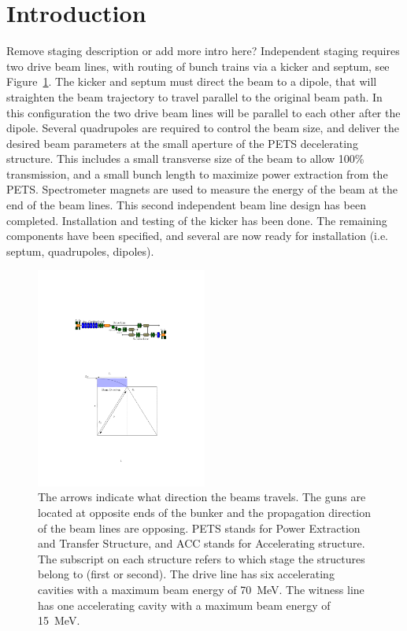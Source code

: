 \documentclass[aps,prab,preprint,groupedaddress,linenumbers]{revtex4-2}
\newcommand{\nrnote}[1]{\textsf{{\color{violet}{ NN note:}   #1 }}}
\begin{document}
\section{Introduction}

\nrnote{Remove staging description or add more intro here?}
Independent staging requires two drive beam lines, with routing of bunch trains via a kicker and septum, 
see Figure~\ref{fig:full-staging}. The kicker and septum must direct the beam to a dipole, 
that will straighten the beam trajectory to travel parallel to the original beam path. 
In this configuration the two drive beam lines will be parallel to each other after the dipole.
Several quadrupoles are required to control the beam size, and deliver the desired beam parameters
at the small aperture of the PETS decelerating structure. 
This includes a small transverse size of the beam to allow 100\% transmission, 
and a small bunch length to maximize power extraction from the PETS.
Spectrometer magnets are used to measure the energy of the beam at the end of the beam lines.
This second independent beam line design has been completed. 
Installation and testing of the kicker has been done.  
The remaining components have been specified, and several are now ready for installation (i.e. septum, quadrupoles, dipoles).
\begin{figure}
\includegraphics[width=0.5\textwidth]{full_staging}
	\caption{The arrows indicate what direction the beams travels.
		The guns are located at opposite ends of the bunker and 
		the propagation direction of the beam lines are opposing.
		PETS stands for Power Extraction and Transfer Structure, and ACC stands for Accelerating structure. 
		The subscript on each structure refers to which stage the structures belong to (first or second). 
		The drive line has six accelerating cavities with a maximum beam energy of \SI{70}{MeV}. 
		The witness line has one accelerating cavity with a maximum beam energy of \SI{15}{MeV}.}
	\label{fig:full-staging}
\end{figure}
\end{document}
